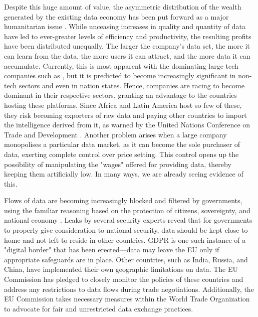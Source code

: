 Despite this huge amount of value, the asymmetric distribution of the wealth generated by the existing data economy has been put forward as a major humanitarian issue \cite{TheWinner2020Feb}. While unceasing increases in quality and quantity of data have led to ever-greater levels of efficiency and productivity, the resulting profits have been distributed unequally. The larger the company's data set, the more it can learn from the data, the more users it can attract, and the more data it can accumulate. Currently, this is most apparent with the dominating large tech companies such as , but it is predicted to become increasingly significant in non-tech sectors and even in nation states. Hence, companies are racing to become dominant in their respective sectors, granting an advantage to the countries hosting these platforms. Since Africa and Latin America host so few of these, they risk becoming exporters of raw data and paying other countries to import the intelligence derived from it, as warned by the United Nations Conference on Trade and Development \cite{TheWinner2020Feb}. Another problem arises when a large company monopolises a particular data market, as it can become the sole purchaser of data, exerting complete control over price setting. This control opens up the possibility of manipulating the "wages" offered for providing data, thereby keeping them artificially low. In many ways, we are already seeing evidence of this. 


Flows of data are becoming increasingly blocked and filtered by governments, using the familiar reasoning based on the protection of citizens, sovereignty, and national economy \cite{VirtualNationalism2020Feb}. Leaks by several security experts reveal that for governments to properly give consideration to national security, data should be kept close to home and not left to reside in other countries. GDPR is one such instance of a "digital border" that has been erected—data may leave the EU only if appropriate safeguards are in place. Other countries, such as India, Russia, and China, have implemented their own geographic limitations on data. The EU Commission has pledged to closely monitor the policies of these countries and address any restrictions to data flows during trade negotiations. Additionally, the EU Commission takes necessary measures within the World Trade Organization \cite{EUWhitePaperAI2020Feb} to advocate for fair and unrestricted data exchange practices.

